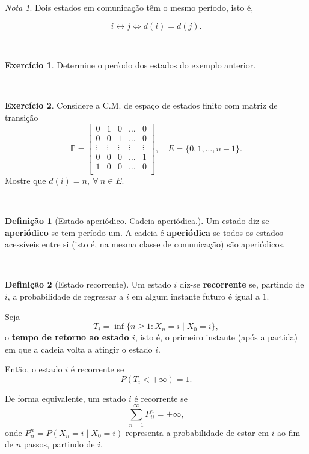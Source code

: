 \documentclass[
  11pt,
  a4paper,
]{book}
\theoremstyle{definition}
\newtheorem{definition}{Definição}[chapter]
\theoremstyle{definition}
\theoremstyle{definition}
\newtheorem{exercise}{Exercício}[chapter]
\theoremstyle{definition}
\theoremstyle{remark}
\newtheorem*{remark}{Nota }
\begin{document}
\begin{remark}
Dois estados em comunicação têm o mesmo período, isto é,

\[i \longleftrightarrow j \iff d(i)=d(j).\]
\end{remark}

\(\,\)

\begin{exercise}
Determine o período dos estados do exemplo anterior.
\end{exercise}

\(\,\)

\begin{exercise}
Considere a C.M. de espaço de estados finito com matriz de transição
\[
\mathbb{P} =
\begin{bmatrix}
0 & 1 & 0 & \dots & 0 \\
0 & 0 & 1 & \dots & 0 \\
\vdots & \vdots & \vdots & \vdots & \vdots \\
0 & 0 & 0 & \dots & 1 \\
1 & 0 & 0 & \dots & 0  \\
\end{bmatrix}, \quad E=\{0,1,\dots,n-1\}.
\]
Mostre que \(d(i)=n, ~\forall ~n \in E.\)
\end{exercise}

\(\,\)

\begin{definition}[Estado aperiódico. Cadeia aperiódica.]
Um estado diz-se \textbf{aperiódico} se tem período um. A cadeia é \textbf{aperiódica} se todos os estados acessíveis entre si (isto é, na mesma classe de comunicação) são aperiódicos.
\end{definition}

\(\,\)

\begin{definition}[Estado recorrente]
Um estado \(i\) diz-se \textbf{recorrente} se, partindo de \(i\), a probabilidade de regressar a \(i\) em algum instante futuro é igual a \(1\).

Seja
\[
T_i = \inf \{ n \geq 1 : X_n = i \mid X_0 = i \},
\]
o \textbf{tempo de retorno ao estado \(i\)}, isto é, o primeiro instante (após a partida) em que a cadeia volta a atingir o estado \(i\).

Então, o estado \(i\) é recorrente se
\[
P(T_i < +\infty) = 1.
\]

De forma equivalente, um estado \(i\) é recorrente se
\[
\sum_{n=1}^\infty P_{ii}^n = +\infty,
\]
onde \(P_{ii}^n = P(X_n = i \mid X_0 = i)\) representa a probabilidade de estar em \(i\) ao fim de \(n\) passos, partindo de \(i\).
\end{definition}
\end{document}

